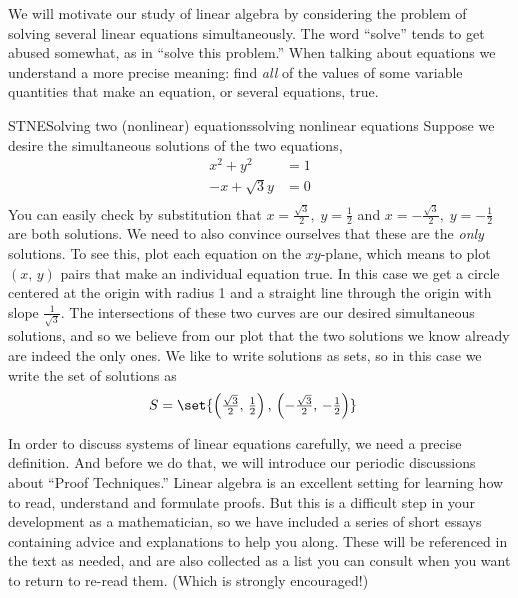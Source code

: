 %
We will motivate our study of linear algebra by considering the problem of solving several linear equations simultaneously.  The word ``solve'' tends to get abused somewhat, as in ``solve this problem.''  When talking about equations we understand a more precise meaning:  find {\em all} of the values of some variable quantities that make an equation, or several equations, true.
%
%
\begin{example}{STNE}{Solving two (nonlinear) equations}{solving nonlinear equations}
Suppose we desire the simultaneous solutions of the two equations,
%
\begin{align*}
x^2+y^2&=1\\
-x+\sqrt{3}y&=0\\
\end{align*}
%
You can easily check by substitution that $x=\tfrac{\sqrt{3}}{2},\;y=\tfrac{1}{2}$ and $x=-\tfrac{\sqrt{3}}{2},\;y=-\tfrac{1}{2}$ are both solutions.  We need to also convince ourselves that these are the {\em only} solutions.  To see this, plot each equation on the $xy$-plane, which means to plot $(x,\,y)$ pairs that make an individual equation true.  In this case we get a circle centered at the origin with radius 1 and a straight line through the origin with slope $\tfrac{1}{\sqrt{3}}$.  The intersections of these two curves are our desired simultaneous solutions, and so we believe from our plot that the two solutions we know already are indeed the only ones.  We like to write solutions as sets, so in this case we write the set of solutions as
%
\begin{align*}
S&=\set{\left(\tfrac{\sqrt{3}}{2},\,\tfrac{1}{2}\right),\,\left(-\tfrac{\sqrt{3}}{2},\,-\tfrac{1}{2}\right)}
\end{align*}
%
\end{example}
%
In order to discuss systems of linear equations carefully, we need a precise definition.  And before we do that, we will introduce our periodic discussions about ``Proof Techniques.'' Linear algebra is an excellent setting for learning how to read, understand and formulate proofs.  But this is a difficult step in your development as a mathematician, so we have included a series of short essays containing advice and explanations to help you along.  These will be referenced in the text as needed, and are also collected as a list you can consult when you want to return to re-read them. (Which is strongly encouraged!)\par
